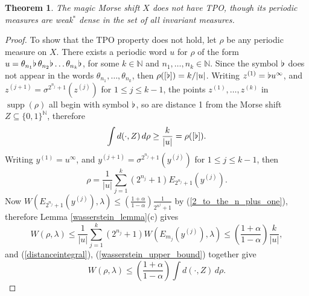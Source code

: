 \documentclass[reqno,11pt]{amsart}
\newtheorem{thm}{Theorem}[section]
\theoremstyle{definition}
\theoremstyle{remark}
\theoremstyle{remark}
\def \N {\mathbb N}
\def\a{\alpha}
\newcommand{\supp}{\operatorname{supp}}
\def\b{\kern 0.02em \flat \kern 0.02em}
\numberwithin{equation}{section}
\begin{document}
\begin{thm}\label{magic_Morse_non_tpo}
The magic Morse shift $X$ does not have TPO, though its periodic measures are weak$^*$ dense in the set of all invariant 
measures.
\end{thm}
\begin{proof}
To show that the TPO property does not hold,
let $\rho$ be any periodic measure on $X$.
There exists a periodic word $u$ for $\rho$ of the form $u=\theta_{n_1}\b\, \theta_{n_2}\b\ldots \theta_{n_k}\b$,
for some $k\in\N$ and $n_1,\ldots,n_k\in\N$.
Since the symbol $\b$ does not appear in the words $\theta_{n_1},\ldots, \theta_{n_k}$,
then $\rho([\b])=k/|u|$.
Writing 
$z^{(1)}=\b u^\infty$, 
and $z^{(j+1)}=\sigma^{2^{n_j}+1}(z^{(j)})$ for $1\le j\le k-1$,
the points $z^{(1)}, \ldots, z^{(k)}$ in $\supp (\rho)$ all begin with symbol $\b$, so are distance 1 from 
the Morse shift $Z\subseteq\{0,1\}^\N$,
therefore
\begin{equation}\label{distanceintegral}
\int d(\cdot, Z)\, d\rho \ge \frac{k}{|u|}=\rho([\b]).
\end{equation}
Writing $y^{(1)}=u^\infty$, 
and $y^{(j+1)}=\sigma^{2^{n_j}+1}(y^{(j)})$ for $1\le j\le k-1$, then
$$
\rho = \frac{1}{|u|} \sum_{j=1}^k  (2^{n_j}+1)  E_{2^{n_j}+1}(y^{(j)}).
$$
Now $W(E_{2^{n_j}+1}(y^{(j)}),\lambda)\le \left(\frac{1+\a}{1-\a}\right) \frac{1}{2^{n^j}+1}$ by 
(\ref{2_to_the_n_plus_one}),
therefore Lemma \ref{wasserstein_lemma}(c) gives
\begin{equation}\label{wasserstein_upper_bound}
W(\rho,\lambda) \le \frac{1}{|u|}\sum_{j=1}^k (2^{n_j}+1) W(E_{m_j}(y^{(j)}),\lambda)
\le \left(\frac{1+\a}{1-\a}\right)\frac{k}{|u|},
\end{equation}
and (\ref{distanceintegral}), (\ref{wasserstein_upper_bound}) together give
\begin{equation}\label{big_Delta_W}
W(\rho,\lambda) \le \left(\frac{1+\a}{1-\a}\right) \int d(\cdot, Z)\, d\rho .
\end{equation}


\end{proof}
\end{document}
